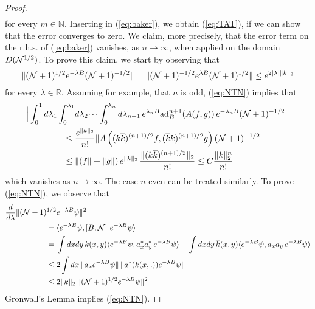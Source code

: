 \documentclass[11pt,a4paper,DIV11]{scrartcl}	%
\newcommand{\bR}{{\mathbb R}}
\newcommand{\bN}{{\mathbb N}}
\newcommand{\cN}{{\cal N}}
\begin{document}
\begin{proof}
\[\begin{split}
\end{split} \]
for every $m \in \bN$. Inserting in (\ref{eq:baker}), we obtain (\ref{eq:TAT}), if we can show that 
the error converges to zero. We claim, more precisely, that the error term on the r.h.s. of (\ref{eq:baker}) vanishes, as $n \to \infty$, when applied on the domain $D(\cN^{1/2})$. 
To prove this claim, we start by observing that
\begin{equation}\label{eq:NTN} \| (\cN+1)^{1/2} e^{-\lambda B} (\cN+1)^{-1/2} \| = \| (\cN+1)^{-1/2} e^{\lambda B} (\cN+1)^{1/2} \| \leq e^{2 |\lambda| \| k \|_2} \end{equation}
for every $\lambda \in \bR$. Assuming for example, that $n$ is odd, (\ref{eq:NTN}) implies that 
\[ \begin{split} \Big| \int_0^1 d\lambda_1 \int_0^{\lambda_1} &d\lambda_2 \dots \int_0^{\lambda_{n}} d\lambda_{n+1} \, e^{\lambda_n B}  \text{ad}_B^{n+1} (A (f,g)) \, e^{-\lambda_n B} (\cN +1)^{-1/2} \Big\| \\ \leq \; & \frac{e^{\| k \|_2}}{n!}  \| A \left( (k\overline{k})^{(n+1)/2} f , (\overline{k} k)^{(n+1)/2} g \right) (\cN+1)^{-1/2} \| \\
\leq \; & \| (f \| + \| g \|) \, e^{\| k \|_2} \, \frac{\| (k\overline{k})^{(n+1)/2} \|_2}{n!} \leq C \frac{\| k \|_2^n}{n!} 
\end{split}\]
which vanishes as $n \to \infty$. The case $n$ even can be treated similarly. To prove (\ref{eq:NTN}), we observe that 
\[ \begin{split} \frac{d}{d\lambda} \| (\cN+1)^{1/2} & e^{-\lambda B} \psi \|^2  \\ =\; & \langle e^{-\lambda B} \psi, \left[ B , \cN \right] \, e^{-\lambda B} \psi \rangle \\ = \; & \int dx dy \,  k(x,y) \langle e^{-\lambda B} \psi, a_x^* a_y^* \, e^{-\lambda B} \psi \rangle + \int dx dy \, \overline{k} (x,y) \langle e^{-\lambda B} \psi, a_x a_y \, e^{-\lambda B} \psi \rangle \\ 
\leq \; & 2\int dx \, \| a_x e^{-\lambda B} \psi \| \, \| a^* (k(x,.)) e^{-\lambda B} \psi \| \\ 
\leq \; &2 \| k \|_2 \,  \| (\cN+1)^{1/2} e^{-\lambda B} \psi \|^2
\end{split} \]
Gronwall's Lemma implies (\ref{eq:NTN}).   


\end{proof}
\end{document}
